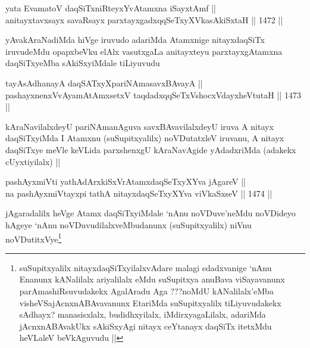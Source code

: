 \begin{shl}
yata EvamatoV daqSiTxniRteyxYvA\s \s tamxna iSayxtAmf || \\
anitayxtavxsayx savaRsayx parxtayxgadxqqSeTxyXVkasAkiSxtaH ||  1472 ||  
\end{shl}

\begin{artha}
yAvakAraNadiMda hiVge iruvudo adariMda Atamxnige nitayxdaqSiTx iruvudeMdu opapxbeVku elAlx vasutxgaLa anitayxteyu parxtayxgAtamxna daqSiTxyeMba sAkiSxyiMdale tiLiyuvudu
\end{artha}


\begin{shl}
tayA\s sAdhanayA daqSATxyX\s pariNAmasavxBAvayA ||  \\
pashayxnenxVvAyamAtAmx\s \s setxV taqdadxqqSeTxVshocxVdayxheVtutaH ||  1473 ||  
\end{shl}

\begin{artha}
kAraNavilalxdeyU pariNAmanAguva savxBAvavilalxdeyU iruva A nitayx daqSiTxyiMda I Atamxnu (suSupitxyalilx) noVDutatxleV iruvanu, A nitayx daqSiTxye meVle keVLida parxshenxgU kAraNavAgide yAdadxriMda (adakekx cUyxtiyilalx) ||
\end{artha}


\begin{shl}
pashAyxmiVti yathA\s dArxkiSxVrAtamxdaqSeTxyXYva jAgareV || \\
na pashAyxmiVtayxpi tathA nitayxdaqSeTxyXYva viVkaSxseV ||  1474 ||  
\end{shl}

\begin{artha}
jAgaradalilx heVge Atamx daqSiTxyiMdale `nAnu noVDuve'neMdu noVDideyo hAgeye `nAnu noVDuvudilalxveMbudanunx (suSupitxyalilx) niVnu noVDutitxVye\footnote{suSupitxyalilx nitayxdaqSiTxyilalxvAdare malagi edadxvanige `nAnu Enanunx kANalilalx ariyalilalx eMdu suSupitxya anuBava viSayavanunx parAmashiRsuvudakekx AgalAradu Aga ???noMdU kANalilalx'eMba visheVSajAcnxnABAvavanunx EtariMda suSupitxyalilx tiLiyuvudakekx sAdhayx? manasisxlalx, budidhxyilalx, iMdirxyagaLilalx, adariMda jAcnxnABAvakUkx sAkiSxyAgi nitayx ceYtanayx daqSiTx itetxMdu heVLaleV beVkAguvudu ||} 
\end{artha}


